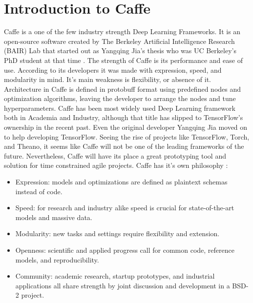 \documentclass[paper=a4, fontsize=11pt]{scrartcl}
\numberwithin{equation}{section}		%
\numberwithin{figure}{section}			%
\numberwithin{table}{section}			%
\begin{document}
	\section{Introduction to Caffe}
	Caffe is a one of the few industry strength Deep Learning Frameworks. It is an open-source software created by The Berkeley Artificial Intelligence Research (BAIR) Lab that started out as Yangqing Jia's thesis who was UC Berkeley's PhD student at that time \cite{daggerfs}. The strength of Caffe is its performance and ease of use. According to its developers it was made with expression, speed, and modularity in mind. It's main weakness is flexibility, or absence of it. Architecture in Caffe is defined in protobuff format using predefined nodes and optimization algorithms, leaving the developer to arrange the nodes and tune hyperparameters. Caffe has been most widely used Deep Learning framework both in Academia and Industry, although that title has slipped to TensorFlow's ownership in the recent past. Even the original developer Yangqing Jia moved on to help developing TensorFlow. Seeing the rise of projects like TensorFlow, Torch, and Theano, it seems like Caffe will not be one of the leading frameworks of the future. Nevertheless, Caffe will have its place a great prototyping tool and solution for time constrained agile projects. Caffe has it's own philosophy \cite{caffe-berkeleyvision}:
		\begin{itemize}
			\item Expression: models and optimizations are defined as plaintext schemas instead of code.
			\item Speed: for research and industry alike speed is crucial for state-of-the-art models and massive data. 
			\item Modularity: new tasks and settings require flexibility and extension.
			\item Openness: scientific and applied progress call for common code, reference models, and reproducibility.
			\item Community: academic research, startup prototypes, and industrial applications all share strength by joint discussion and development in a BSD-2 project.
		\end{itemize}
	
\end{document}
